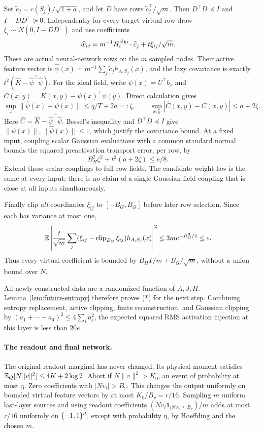 Set $\widetilde c_j=c(S_j)/\sqrt{1+a}$, and let $D$ have rows
$\widetilde c_j^\top/\sqrt m$. Then $D^\top D\preceq I$ and
$I-DD^\top\succeq0$. Independently for every target virtual row draw
$\xi_i\sim N(0,I-DD^\top)$ and use coefficients
\begin{equation}\label{eq:finite-row}
 \widehat w_{ij}=m^{-1}H_i^{\rm clip}\cdot\widetilde c_j
                         +t\xi_{ij}/\sqrt m.
\end{equation}
These are actual neural-network rows on the $m$ sampled nodes.
Their active feature vector is
$\widehat\psi(x)=m^{-1}\sum_j\widetilde c_jh_{A,S_j}(x)$, and the lazy
covariance is exactly $t^2(\widehat K-\widehat\psi^\top\widehat\psi)$.
For the ideal field, write $\psi(x)=U^\top b_x$ and
$C(x,y)=K(x,y)-\psi(x)^\top\psi(y)$. Direct calculation gives
\[
 \sup_x\|\widehat\psi(x)-\psi(x)\|\le q/T+2a=:\zeta,
 \qquad \sup_{x,y}|\widehat C(x,y)-C(x,y)|\le a+2\zeta.
\]
Here $\widehat C=\widehat K-\widehat\psi^\top\widehat\psi$.
Bessel's inequality and $D^\top D\preceq I$ give
$\|\psi(x)\|,\|\widehat\psi(x)\|\le1$, which justify the covariance bound.
At a fixed input, coupling scalar Gaussian evaluations with a common standard
normal bounds the squared preactivation transport error, per row, by
\[
 B_H^2\zeta^2+t^2(a+2\zeta)\le e/8.
\]
Extend these scalar couplings to full row fields. The candidate weight law is
the same at every input; there is no claim of a single Gaussian-field coupling
that is close at all inputs simultaneously.

Finally clip \emph{all} coordinates $\xi_{ij}$ to $[-B_G,B_G]$ before later
row selection. Since each has variance at most one,
\[
 \mathbb E\left|\frac{t}{\sqrt m}\sum_j
   (\xi_{ij}-\operatorname{clip}_{B_G}\xi_{ij})h_{A,S_j}(x)\right|^2
 \le3m e^{-B_G^2/4}\le e.
\]
Thus every virtual coefficient is bounded by $B_HT/m+B_G/\sqrt m$,
without a union bound over $N$.

All newly constructed data are a randomized function of $A,J,H$.
Lemma~\ref{lem:future-entropy} therefore proves (*) for the next step.
Combining entropy replacement, active clipping, finite reconstruction, and
Gaussian clipping by $(a_1+\cdots+a_4)^2\le4\sum_i a_i^2$, the expected
squared RMS activation injection at this layer is less than $20e$.

\paragraph{The readout and final network.}
The original readout marginal has never changed. Its physical moment satisfies
$\mathbb E_Q[N\|v\|^2]\le4K+2\log2$.
Abort if $N\|v\|^2>K_0$, an event of probability at most $\eta$.
Zero coefficients with $|Nv_i|>B_v$. This changes the output uniformly on
bounded virtual feature vectors by at most $K_0/B_v=r/16$.
Sampling $m$ uniform last-layer sources and using readout coefficients
$(Nv_i\mathbf1_{|Nv_i|\le B_v})/m$ adds at most $r/16$ uniformly on $\{-1,1\}^d$,
except with probability $\eta$, by Hoeffding and the chosen $m$.

